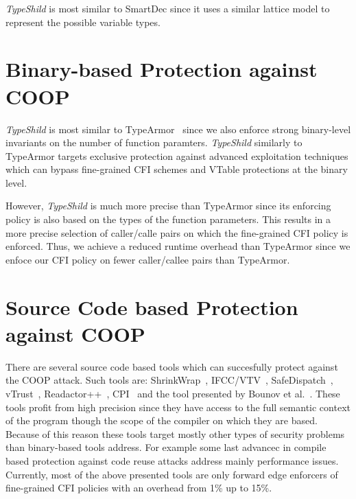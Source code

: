 \textit{TypeShild} is most similar to SmartDec since it uses a similar lattice model to
represent the possible variable types. 

\section{Binary-based Protection against COOP}
\label{Binary-based Protection against COOP}
\textit{TypeShild} is most similar to TypeArmor~\cite{veen:typearmor} since
we also enforce strong binary-level invariants on the number of function
paramters. \textit{TypeShild} similarly to TypeArmor targets 
exclusive protection against advanced exploitation techniques 
which can bypass fine-grained CFI schemes and VTable protections at the binary level.

However, \textit{TypeShild} is much more precise than TypeArmor since its enforcing 
policy is also based on the types of the function parameters. This results in a
more precise selection of caller/calle pairs on which the fine-grained CFI policy is enforced.
Thus, we achieve a reduced runtime overhead than TypeArmor since we enfoce 
our CFI policy on fewer caller/callee pairs than TypeArmor.



\section{Source Code based Protection against COOP}
\label{Source Code based Protection agaisnt COOP}
There are several source code based tools 
which can succesfully protect against the COOP attack.
Such tools are: ShrinkWrap~\cite{haller:shrinkwrap}, IFCC/VTV~\cite{vtv:tice}, 
SafeDispatch~\cite{safedispatch:jang}, vTrust~\cite{zhang:vtrust}, Readactor++~\cite{crane:readactor++}, CPI~\cite{volodymyr:cpi} and the
tool presented by Bounov et al.~\cite{bounov:interleaving}. These tools profit from high precision
since they have access to the full semantic context of the program though the scope
of the compiler on which they are based. 
Because of this reason these tools target mostly other types of security problems than binary-based 
tools address. For example some last advancec in compile based protection against 
code reuse attacks address mainly performance issues.
Currently, most of the above presented tools are only forward
edge enforcers of fine-grained CFI policies with an overhead from 1\% up to 15\%.

